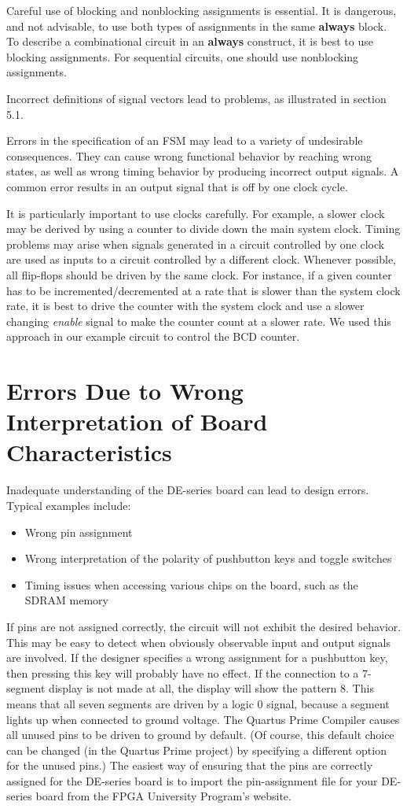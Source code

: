 \documentclass[11pt, twoside, pdftex]{article}
\begin{document}
Careful use of blocking and nonblocking assignments is essential. It is
dangerous, and not advisable, to use both types of assignments in the
same {\bf always} block. To describe a combinational circuit in an {\bf always}
construct, it is best to use blocking assignments. For sequential circuits,
one should use nonblocking assignments.

Incorrect definitions of signal vectors lead to problems, as illustrated in
section 5.1.

Errors in the specification of an FSM may lead to a variety of undesirable
consequences. They can cause wrong functional behavior by reaching wrong states,
as well as wrong timing behavior by producing incorrect output signals.
A common error results in an output signal that is off by one clock cycle.

It is particularly important to use clocks carefully. For example, a slower
clock may be derived by using a counter to divide down the main system clock.
Timing problems may arise when signals generated in a circuit controlled
by one clock are used as inputs to a circuit controlled by a different clock.
Whenever possible, all flip-flops should be driven by the same clock.
For instance, if a given counter has to be incremented/decremented at a rate that 
is slower than the system clock rate, it is best to drive the counter with the 
system clock and use a slower changing {\it enable} signal to make the
counter count at a slower rate. We used this approach in our example circuit
to control the BCD counter.

\section{Errors Due to Wrong Interpretation of Board Characteristics}
Inadequate understanding of the DE-series board can lead to design errors.
Typical examples include:
\begin{itemize}
\item Wrong pin assignment
\item Wrong interpretation of the polarity of pushbutton keys and toggle switches
\item Timing issues when accessing various chips on the board, such as the SDRAM memory
\end{itemize}

If pins are not assigned correctly, the circuit will not exhibit the desired 
behavior. This may be easy to detect when obviously observable input and output signals
are involved. If the designer specifies a wrong assignment for a pushbutton key,
then pressing this key will probably have no effect. If the connection to 
a 7-segment display is not made at all, the display will show the pattern 8.
This means that all seven segments are driven by a logic 0 signal, because a
segment lights up when connected to ground voltage. The Quartus Prime Compiler
causes all unused pins to be driven to ground by default. (Of course, this
default choice can be changed (in the Quartus Prime project) by specifying a 
different option for the unused pins.) The easiest way of ensuring that the pins
are correctly assigned for the DE-series board is to import the pin-assignment file 
for your DE-series board from the FPGA University Program's website.
\end{document}
